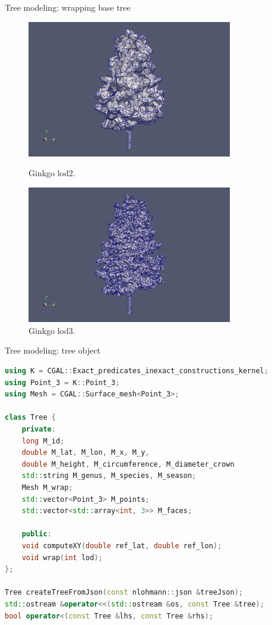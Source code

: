 \documentclass[10pt]{beamer}
\begin{document}
\begin{frame}{Tree modeling: wrapping base tree}
\begin{figure}[H]
    \centering
    \begin{minipage}{0.49\textwidth}
        \centering
        \includegraphics[width=0.8\textwidth]{images/gingko_lod2.png}
        \caption{Ginkgo lod2.}
    \end{minipage}\hfill
    \begin{minipage}{0.49\textwidth}
        \centering
        \includegraphics[width=0.8\textwidth]{images/gingko_lod3.png}
        \caption{Ginkgo lod3.}
    \end{minipage}
\end{figure}
\end{frame}

\begin{frame}[fragile]{Tree modeling: tree object}

\begin{lstlisting}[language=C++]
using K = CGAL::Exact_predicates_inexact_constructions_kernel;
using Point_3 = K::Point_3;
using Mesh = CGAL::Surface_mesh<Point_3>;

class Tree {
    private:
    long M_id;
    double M_lat, M_lon, M_x, M_y,
    double M_height, M_circumference, M_diameter_crown
    std::string M_genus, M_species, M_season;
    Mesh M_wrap;
    std::vector<Point_3> M_points;
    std::vector<std::array<int, 3>> M_faces;

    public:
    void computeXY(double ref_lat, double ref_lon);
    void wrap(int lod);
};

Tree createTreeFromJson(const nlohmann::json &treeJson);
std::ostream &operator<<(std::ostream &os, const Tree &tree);
bool operator<(const Tree &lhs, const Tree &rhs);
\end{lstlisting}
\end{frame}
\end{document}
